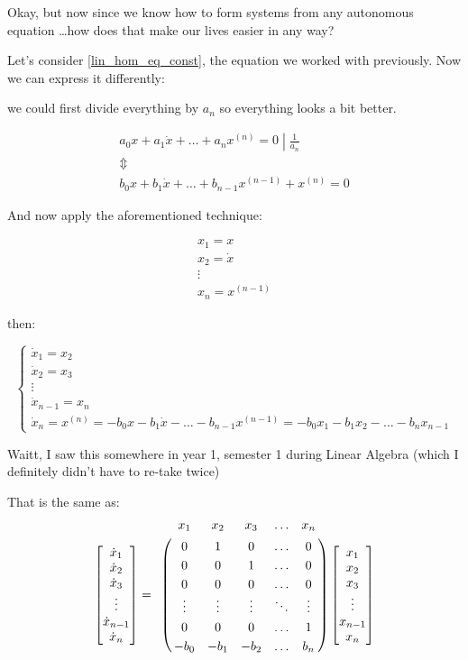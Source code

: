 Okay, but now since we know how to form systems from any autonomous equation \dots how does that make our lives easier in any way?

Let's consider \ref{lin_hom_eq_const}, the equation we worked with previously. Now we can express it differently:

we could first divide everything by $a_{n}$ so everything looks a bit better.

\begin{gather*}
  \left. a_0 x + a_1\dot{x}+ \dots +a_{n} x^{(n)} = 0 \middle| \frac{1}{a_{n}} \right. \\
  \Updownarrow \\
  b_0 x + b_1\dot{x} + \dots + b_{n-1} x^{(n-1)} + x^{(n)} = 0
\end{gather*}

And now apply the aforementioned technique:

\begin{gather*}
  x_1 = x     \\
  x_2 = \dot{x} \\
  \vdots \\
  x_n = x^{(n-1)}
\end{gather*}

then:

\[
  \begin{cases}
    \dot{x}_1 = x_2     \\
    \dot{x}_2 = x_3     \\
    \vdots              \\
    \dot{x}_{n-1} = x_n \\
    \dot{x}_n  = x^{(n)} = -b_0x - b_1\dot{x} - \dots - b_{n-1} x^{(n-1)} = -b_0 x_1 - b_1 x_2 - \dots - b_n x_{n-1}
  \end{cases}
\]

Waitt, I saw this somewhere in year 1, semester 1 during Linear Algebra (which I definitely didn't have to re-take twice)

That is the same as:
\begin{align*}
  \begin{bmatrix}
    \dot{x}_1     \\
    \dot{x}_2     \\
    \dot{x}_3     \\
    \vdots        \\
    \dot{x}_{n-1} \\
    \dot{x}_n
  \end{bmatrix} =
  \bordermatrix{ & x_1    & x_2    & x_3    & \ldots & x_n \cr
    & 0      & 1      & 0      & \ldots & 0 \cr
    & 0      & 0      & 1      & \ldots & 0 \cr
    & 0      & 0      & 0      & \ldots & 0 \cr
    & \vdots & \vdots & \vdots & \ddots & \vdots \cr
    & 0      & 0      & 0      & \ldots & 1 \cr
  & -b_0   & -b_1   & -b_2   & \ldots & b_n }
  \begin{bmatrix}
    x_1     \\
    x_2     \\
    x_3     \\
    \vdots  \\
    x_{n-1} \\
    x_n
  \end{bmatrix}
\end{align*}

